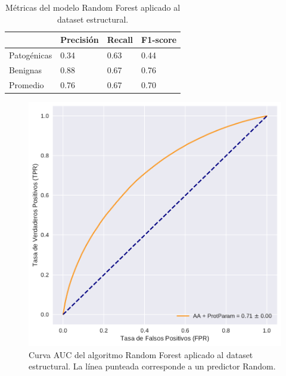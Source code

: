 \begin{table}[H]
\centering
\begin{tabular}{|l|l|l|l|}
\hline
              & Precisión & Recall & F1-score \\ \hline
Patogénicas   & 0.34      & 0.63   & 0.44     \\ \hline
Benignas      & 0.88      & 0.67   & 0.76     \\ \hline
Promedio      & 0.76      & 0.67   & 0.70     \\ \hline
\end{tabular}
\caption{Métricas del modelo Random Forest aplicado al dataset estructural.}
\label{my-label}
\end{table}


\begin{figure}[h]
    \centering
    \includegraphics[scale=0.55]{documents/latex/figures/3/auc_1.pdf}
    \caption{Curva AUC del algoritmo Random Forest aplicado al dataset estructural. La línea punteada corresponde a un predictor Random.}
    \label{fig:auc_1}
\end{figure}


